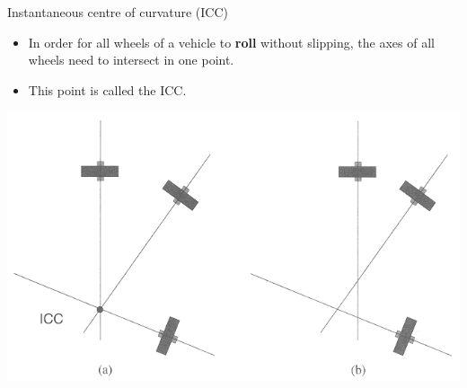 \documentclass[compress]{beamer}
\begin{document}
\begin{frame}{Instantaneous centre of curvature (ICC)}

\begin{itemize}
    \item In order for all wheels of a vehicle to \textbf{roll} without
  slipping, the axes of all wheels need to intersect in one point.
    \item This point is called the ICC.
\end{itemize}

    \begin{center}
        \includegraphics[width=0.8\linewidth]{icc}
    \end{center}
\end{frame}
\end{document}
